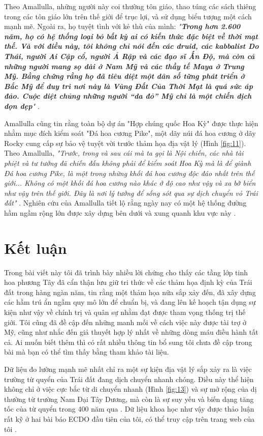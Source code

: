 \documentclass[10pt,twocolumn,letterpaper]{article}
\begin{document}
Theo Amallulla, những người này coi thường tôn giáo, thao túng các sách thiêng trong các tôn giáo lớn trên thế giới để trục lợi, và sử dụng biểu tượng một cách mạnh mẽ. Ngoài ra, họ tuyệt tình với kẻ thù của mình: \textit{"\textbf{Trong hơn 2.600 năm, họ có hệ thống loại bỏ bất kỳ ai có kiến thức đặc biệt về thời mạt thế. Và với điều này, tôi không chỉ nói đến các druid, các kabbalist Do Thái, người Ai Cập cổ, người Ả Rập và các đạo sĩ Ấn Độ, mà còn cả những người mang sọ dài ở Nam Mỹ và các thầy tế Maya ở Trung Mỹ. Bằng chứng rằng họ đã tiêu diệt một dân số từng phát triển ở Bắc Mỹ để duy trì nơi này là Vùng Đất Của Thời Mạt là quá sức áp đảo. Cuộc diệt chủng những người “da đỏ” Mỹ chỉ là một chiến dịch dọn dẹp}"} \cite{33,34}.

Amallulla cũng tin rằng toàn bộ dự án "Hợp chúng quốc Hoa Kỳ" được thực hiện nhằm mục đích kiểm soát "Đá hoa cương Pike", một dãy núi đá hoa cương ở dãy Rocky cung cấp sự bảo vệ tuyệt vời trước thảm họa địa vật lý (Hình \ref{fig:11}). Theo Amallulla, \textit{"Trước, trong và sau cái mà ta gọi là Nội chiến, các nhà tài phiệt và tư tưởng đã chiến đấu không phải để kiểm soát Hoa Kỳ mà là để giành Đá hoa cương Pike, là một trong những khối đá hoa cương độc đáo nhất trên thế giới... Không có một khối đá hoa cương nào khác ở độ cao như vậy và xa bờ biển như vậy trên thế giới. Đây là nơi lý tưởng để sống sót qua sự dịch chuyển vỏ Trái đất"} \cite{33,34}. Nghiên cứu của Amallulla tiết lộ rằng ngày nay có một hệ thống đường hầm ngầm rộng lớn được xây dựng bên dưới và xung quanh khu vực này \cite{36}.

\section{Kết luận}

Trong bài viết này tôi đã trình bày nhiều lời chứng cho thấy các tầng lớp tinh hoa phương Tây đã cẩn thận lưu giữ tri thức về các thảm họa định kỳ của Trái đất trong hàng ngàn năm, tin rằng một thảm họa nữa sắp xảy đến, đã xây dựng các hầm trú ẩn ngầm quy mô lớn để chuẩn bị, và đang lên kế hoạch tận dụng sự kiện như vậy về chính trị và quân sự nhằm đạt được tham vọng thống trị thế giới. Tôi cũng đã đề cập đến những manh mối về cách việc này được tài trợ ở Mỹ, cũng như nhắc đến giả thuyết hợp lý nhất về những dòng máu điều hành tất cả. Ai muốn biết thêm thì có rất nhiều thông tin bổ sung tôi chưa đề cập trong bài mà bạn có thể tìm thấy bằng tham khảo tài liệu.

Dữ liệu đo lường mạnh mẽ nhất chỉ ra một sự kiện địa vật lý sắp xảy ra là việc trường từ quyển của Trái đất đang dịch chuyển nhanh chóng. Điều này thể hiện không chỉ ở việc cực bắc từ di chuyển nhanh (Hình \ref{fig:13}) và sự mở rộng của dị thường từ trường Nam Đại Tây Dương, mà còn là sự suy yếu và biến dạng tăng tốc của từ quyển trong 400 năm qua \cite{3}. Dữ liệu khoa học như vậy được thảo luận rất kỹ ở hai bài báo ECDO đầu tiên của tôi, có thể truy cập trên trang web của tôi \cite{3}.
\end{document}

